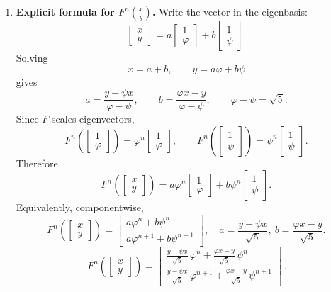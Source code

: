 \documentclass[12pt]{article}
\begin{document}
\begin{enumerate}[label=(\alph*)]
\item \textbf{Explicit formula for $F^n\!\binom{x}{y}$.}
Write the vector in the eigenbasis:
\[
\begin{bmatrix}x\\y\end{bmatrix}
=
a\begin{bmatrix}1\\ \varphi\end{bmatrix}
+b\begin{bmatrix}1\\ \psi\end{bmatrix}.
\]
Solving
\[
x=a+b,\qquad y=a\varphi+b\psi
\]
gives
\[
a=\frac{y-\psi x}{\varphi-\psi},\qquad b=\frac{\varphi x-y}{\varphi-\psi},
\qquad \varphi-\psi=\sqrt5.
\]
Since $F$ scales eigenvectors,
\[
F^n\!\left(\begin{bmatrix}1\\ \varphi\end{bmatrix}\right)=\varphi^n\begin{bmatrix}1\\ \varphi\end{bmatrix},
\qquad
F^n\!\left(\begin{bmatrix}1\\ \psi\end{bmatrix}\right)=\psi^n\begin{bmatrix}1\\ \psi\end{bmatrix}.
\]
Therefore
\[
F^n\!\left(\begin{bmatrix}x\\y\end{bmatrix}\right)
=
a\varphi^n\begin{bmatrix}1\\ \varphi\end{bmatrix}
+
b\psi^n\begin{bmatrix}1\\ \psi\end{bmatrix}.
\]
Equivalently, componentwise,
\[
F^n\!\left(\begin{bmatrix}x\\y\end{bmatrix}\right)
=
\begin{bmatrix}
a\varphi^n+b\psi^n\\
a\varphi^{n+1}+b\psi^{n+1}
\end{bmatrix},
\quad
a=\frac{y-\psi x}{\sqrt5},\ b=\frac{\varphi x-y}{\sqrt5}.
\]
\[
\boxed{
\,
F^n\!\left(\begin{bmatrix}x\\y\end{bmatrix}\right)
=
\begin{bmatrix}
\frac{y-\psi x}{\sqrt5}\,\varphi^n+\frac{\varphi x-y}{\sqrt5}\,\psi^n\\[0.4em]
\frac{y-\psi x}{\sqrt5}\,\varphi^{n+1}+\frac{\varphi x-y}{\sqrt5}\,\psi^{n+1}
\end{bmatrix}
\,}.
\]


\end{enumerate}
\end{document}
